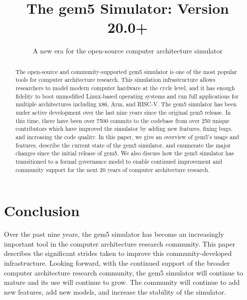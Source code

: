 \documentclass[sigconf,nonacm,screen=true]{acmart}
\begin{document}
\title{The gem5 Simulator: Version 20.0+}
\subtitle{A new era for the open-source computer architecture simulator}



\begin{abstract}
    The open-source and community-supported gem5 simulator is one of the most popular tools for computer architecture research.
    This simulation infrastructure allows researchers to model modern computer hardware at the cycle level, and it has enough fidelity to boot unmodified Linux-based operating systems and run full applications for multiple architectures including x86, Arm\textregistered, and RISC-V.
    The gem5 simulator has been under active development over the last nine years since the original gem5 release.
    In this time, there have been over 7500 commits to the codebase from over 250 unique contributors which have improved the simulator by adding new features, fixing bugs, and increasing the code quality.
    In this paper, we give an overview of gem5's usage and features, describe the current state of the gem5 simulator, and enumerate the major changes since the initial release of gem5.
    We also discuss how the gem5 simulator has transitioned to a formal governance model to enable continued improvement and community support for the next 20 years of computer architecture research.
\end{abstract}

\maketitle
\renewcommand{\shortauthors}{Lowe-Power and the gem5 Community}





\section{Conclusion}

Over the past nine years, the gem5 simulator has become an increasingly important tool in the computer architecture research community.
This paper describes the significant strides taken to improve this community-developed infrastructure.
Looking forward, with the continued support of the broader computer architecture research community, the gem5 simulator will continue to mature and its use will continue to grow.
The community will continue to add new features, add new models, and increase the stability of the simulator.
\end{document}
